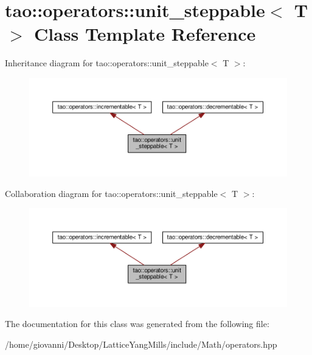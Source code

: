 \hypertarget{classtao_1_1operators_1_1unit__steppable}{}\section{tao\+:\+:operators\+:\+:unit\+\_\+steppable$<$ T $>$ Class Template Reference}
\label{classtao_1_1operators_1_1unit__steppable}


Inheritance diagram for tao\+:\+:operators\+:\+:unit\+\_\+steppable$<$ T $>$\+:\nopagebreak
\begin{figure}[H]
\begin{center}
\leavevmode
\includegraphics[width=350pt]{classtao_1_1operators_1_1unit__steppable__inherit__graph}
\end{center}
\end{figure}


Collaboration diagram for tao\+:\+:operators\+:\+:unit\+\_\+steppable$<$ T $>$\+:\nopagebreak
\begin{figure}[H]
\begin{center}
\leavevmode
\includegraphics[width=350pt]{classtao_1_1operators_1_1unit__steppable__coll__graph}
\end{center}
\end{figure}


The documentation for this class was generated from the following file\+:\begin{DoxyCompactItemize}
\item 
/home/giovanni/\+Desktop/\+Lattice\+Yang\+Mills/include/\+Math/operators.\+hpp\end{DoxyCompactItemize}
